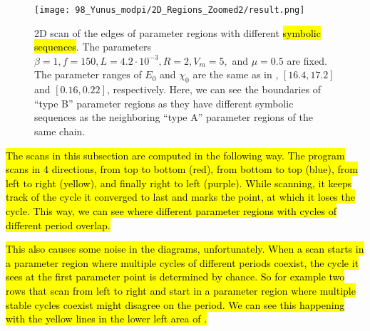 \begin{figure}
	\centering
	\texttt{[image: 98\_Yunus\_modpi/2D\_Regions\_Zoomed2/result.png]}
	\caption[2D scan of the edges of parameter regions with different periods in the adjusted original model]{
		2D scan of the edges of parameter regions with different \hl{symbolic sequences}.
		The parameters $\beta = 1, f = 150, L = 4.2 \cdot 10^{-3}, R = 2, V_m = 5,$ and $\mu = 0.5$ are fixed.
		The parameter ranges of $E_0$ and $\chi_0$ are the same as in , $[16.4, 17.2]$ and $[0.16, 0.22]$, respectively.
		Here, we can see the boundaries of ``type B'' parameter regions as they have different symbolic sequences as the neighboring ``type A'' parameter regions of the same chain.\footnotemark[1]
	}
	\label{fig:etup.og.overlapping.regions.zoomed}
\end{figure}

\hl{
	The scans in this subsection are computed in the following way.
	The program scans in 4 directions, from top to bottom (red), from bottom to top (blue), from left to right (yellow), and finally right to left (purple).
	While scanning, it keeps track of the cycle it converged to last and marks the point, at which it loses the cycle.
	This way, we can see where different parameter regions with cycles of different period overlap.
}

\hl{
	This also causes some noise in the diagrams, unfortunately.
	When a scan starts in a parameter region where multiple cycles of different periods coexist, the cycle it sees at the first parameter point is determined by chance.
	So for example two rows that scan from left to right and start in a parameter region where multiple stable cycles coexist might disagree on the period.
	We can see this happening with the yellow lines in the lower left area of .
}
